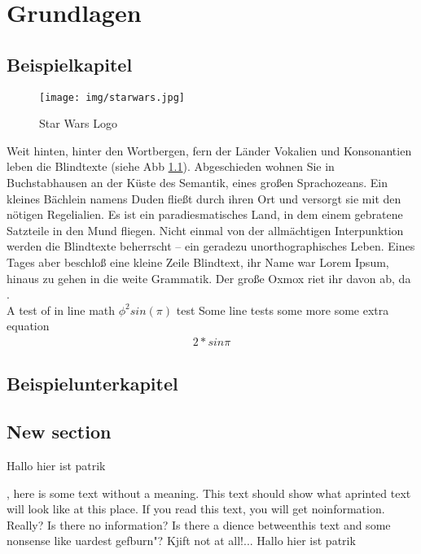 \chapter{Grundlagen}
\label{sec:grundlagen}


\section{Beispielkapitel}
\label{sec:beispiel}
\begin{figure}[htb]
  \centering  
  \texttt{[image: img/starwars.jpg]}
  \caption{Star Wars Logo}
  \label{fig:starwars}
\end{figure}
Weit hinten, hinter den Wortbergen, fern der Länder Vokalien und Konsonantien leben die Blindtexte (siehe Abb \ref{fig:starwars}). Abgeschieden wohnen Sie in Buchstabhausen an der Küste des Semantik, eines großen Sprachozeans. Ein kleines Bächlein namens Duden fließt durch ihren Ort und versorgt sie mit den nötigen Regelialien. Es ist ein paradiesmatisches Land, in dem einem gebratene Satzteile in den Mund fliegen. Nicht einmal von der allmächtigen Interpunktion werden die Blindtexte beherrscht – ein geradezu unorthographisches Leben. Eines Tages aber beschloß eine kleine Zeile Blindtext, ihr Name war Lorem Ipsum, hinaus zu gehen in die weite Grammatik. Der große Oxmox riet ihr davon ab, da \cite{chaudhary_3-d_1998}.
\\

A test of in line math \(\phi^2sin(\pi)\) test
Some line tests
some more
some extra equation 
\begin{align}
	2*sin \pi
\end{align}


\section{Beispielunterkapitel}
\label{subsec:beispiel}

\section{New section}
 
Hallo hier ist patrik


, here is some text without a meaning.  This text should 
show what aprinted text will look like at this place.  If you 
read this text, you will get noinformation.  Really?  Is there 
no information?  Is there a dience betweenthis text and some 
nonsense like uardest gefburn"?  Kjift  not at all!...
Hallo hier ist patrik



